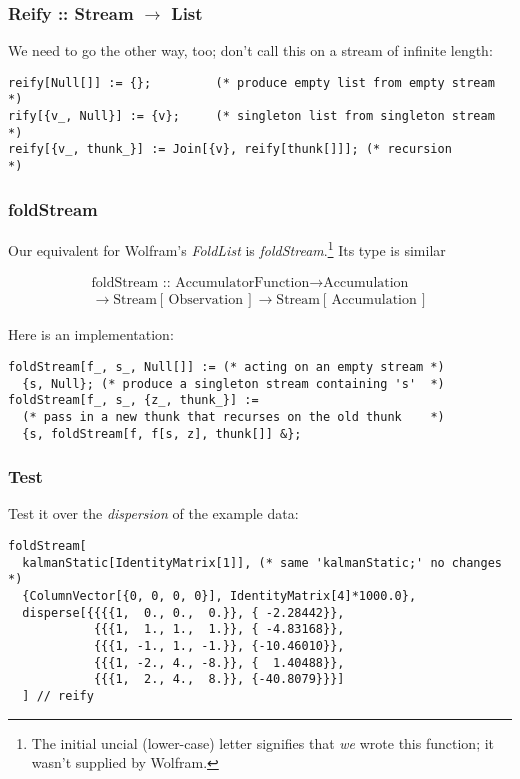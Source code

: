 \documentclass[10pt,oneside,x11names]{article}
\begin{document}
\subsubsection{Reify :: Stream \(\rightarrow\) List}
\label{sec:orgheadline6}

We need to go the other way, too; don't call this on a stream of infinite length:

\begin{verbatim}
reify[Null[]] := {};         (* produce empty list from empty stream *)
rify[{v_, Null}] := {v};     (* singleton list from singleton stream *)
reify[{v_, thunk_}] := Join[{v}, reify[thunk[]]]; (* recursion       *)
\end{verbatim}

\subsubsection{foldStream}
\label{sec:orgheadline7}

Our equivalent for Wolfram's \emph{FoldList} is \emph{foldStream}.\footnote{The initial uncial (lower-case) letter signifies that \emph{we} wrote this function; it wasn't supplied by Wolfram.} Its type is similar

\begin{align*}
\text{foldStream :: }
\text{AccumulatorFunction}
\rightarrow
\text{Accumulation}\\
\rightarrow
\text{Stream}\left[\,\text{Observation}\,\right]
\rightarrow
\text{Stream}\left[\,\text{Accumulation}\,\right]
\end{align*}

Here is an implementation:

\begin{verbatim}
foldStream[f_, s_, Null[]] := (* acting on an empty stream *)
  {s, Null}; (* produce a singleton stream containing 's'  *)
foldStream[f_, s_, {z_, thunk_}] :=
  (* pass in a new thunk that recurses on the old thunk    *)
  {s, foldStream[f, f[s, z], thunk[]] &};
\end{verbatim}

\subsubsection{Test}
\label{sec:orgheadline8}

Test it over the \emph{dispersion} of the example data:

\begin{verbatim}
foldStream[
  kalmanStatic[IdentityMatrix[1]], (* same 'kalmanStatic;' no changes *)
  {ColumnVector[{0, 0, 0, 0}], IdentityMatrix[4]*1000.0},
  disperse[{{{{1,  0., 0.,  0.}}, { -2.28442}}, 
            {{{1,  1., 1.,  1.}}, { -4.83168}}, 
            {{{1, -1., 1., -1.}}, {-10.46010}}, 
            {{{1, -2., 4., -8.}}, {  1.40488}}, 
            {{{1,  2., 4.,  8.}}, {-40.8079}}}]
  ] // reify
\end{verbatim}
\end{document}
